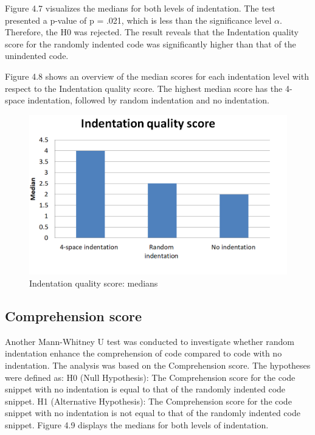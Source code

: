 Figure 4.7 visualizes the medians for both levels of indentation. 
The test presented a p-value of  p = .021, which is less than the significance level \(\alpha \). Therefore, the H0 was rejected. The result reveals that the Indentation quality score for the randomly indented code was significantly higher than that of the unindented code.

Figure 4.8 shows an overview of the median scores for each indentation level with respect to the Indentation quality score. The highest median score has the 4-space indentation, followed by random indentation and no indentation.

\begin{figure} [H]
  \centering
  \includegraphics[scale=0.96]{figures/indsM.png}
  \caption{Indentation quality score: medians}
  \label{fig:AnhangsChor}
\end{figure}


\subsection{Comprehension score}
Another Mann-Whitney U test was conducted to investigate whether random indentation enhance the comprehension  of code compared to code with no indentation. The analysis was based on the Comprehension score. The hypotheses were defined as: H0 (Null Hypothesis): The Comprehension score for the code snippet with no indentation is equal to that of the randomly indented code snippet. H1 (Alternative Hypothesis): The Comprehension score for the code snippet with no indentation is not equal to that of the randomly indented code snippet. Figure 4.9 displays the medians for both levels of indentation.



